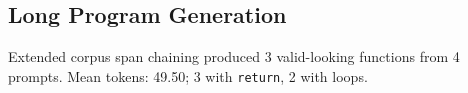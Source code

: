 \subsection{Long Program Generation}
Extended corpus span chaining produced 3 valid-looking functions from 4 prompts.
Mean tokens: 49.50; 3 with \texttt{return}, 2 with loops.
